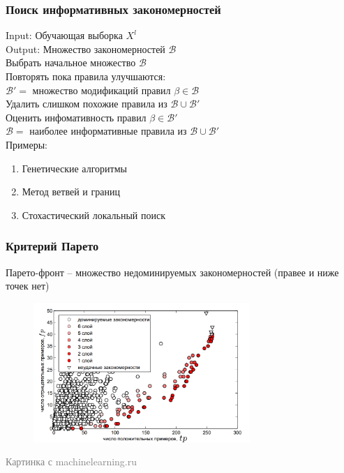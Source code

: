 \documentclass[12pt]{beamer}
\begin{document}
\begin{frame}\frametitle{Поиск информативных закономерностей}
Input: Обучающая выборка $X^l$\\
Output: Множество закономерностей $\mathcal{B}$\\
\vspace{5mm}
Выбрать начальное множество $\mathcal{B}$\\
Повторять пока правила улучшаются:\\
\hspace{10mm} $\mathcal{B}'=$ множество модификаций правил $\beta \in \mathcal{B}$\\
\hspace{10mm} Удалить слишком похожие правила из $\mathcal{B} \cup \mathcal{B}'$\\
\hspace{10mm} Оценить инфомативность правил $\beta \in \mathcal{B}'$\\
\hspace{10mm} $\mathcal{B}=$ наиболее информативные правила из $\mathcal{B} \cup \mathcal{B}'$\\
\vspace{5mm}
Примеры:\\
\begin{enumerate}[--]
	\item Генетические алгоритмы
	\item Метод ветвей и границ	
	\item Стохастический локальный поиск	
\end{enumerate}

\end{frame}

\begin{frame}\frametitle{Критерий Парето}
Парето-фронт -- множество недоминируемых закономерностей (правее и ниже точек нет)
\begin{figure}[htbp]
  \includegraphics[height=150pt, keepaspectratio = true]{images/pareto}   
\end{figure}
\footnotesize\textcolor{gray} {Картинка с machinelearning.ru}
\end{frame}
\end{document}
